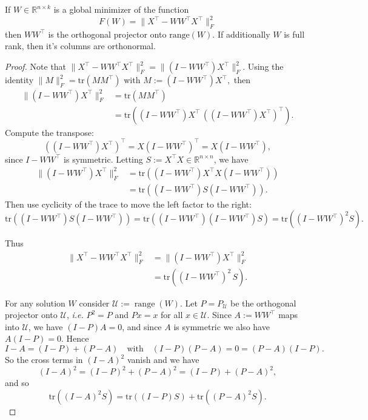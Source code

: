 \documentclass[twoside,11pt]{article}
\begin{document}
\begin{lemma}
\label{lem:orth_projector}
    If $W \in \mathbb{R}^{n\times k}$ is a global minimizer of the function
\[
    F(W)=\|X^\top-WW^\top X^\top\|_F^2
\] then $WW^\top$ is the orthogonal projector onto $\mathrm{range}(W)$. If additionally $W$ is full rank, then it's columns are orthonormal.
\label{lem:projection}
\end{lemma}
\begin{proof}
Note that $\|X^\top-WW^\top X^\top\|_F^2
=\|(I-WW^\top)X^\top\|_F^2$. Using the identity \(\|M\|_F^2=\mathrm{tr}(MM^\top)\) with $M:=(I-WW^\top)X^\top,$
then
\begin{align*}
\|(I-WW^\top)X^\top\|_F^2
&=\mathrm{tr}( M M^\top) \\
&=\mathrm{tr}((I-WW^\top)X^\top\,((I-WW^\top)X^\top)^\top).
\end{align*}
Compute the transpose:
\[
((I-WW^\top)X^\top)^{\top}
= X (I-WW^\top)^\top
= X (I-WW^\top),
\]
since \(I-WW^{\top}\) is symmetric. Letting $S:=X^\top X\in \mathbb{R}^{n\times n}$, we have
\begin{align*}
\|(I-WW^{\top})X^\top\|_F^2
&=\mathrm{tr}((I-WW^\top)X^\top X(I-WW^\top)) \\
&=\mathrm{tr}((I-WW^\top)S(I-WW^\top)).
\end{align*}
Then use cyclicity of the trace to move the left factor to the right:
\[
\mathrm{tr}((I-WW^{\top})S(I-WW^{\top}))
=
\mathrm{tr}((I-WW^\top)(I-WW^\top)S)
=
\mathrm{tr}((I-WW^\top)^2S).
\]

Thus
\begin{align*}
\|X^{\top}-WW^{\top}X^{\top}\|_F^2
&=\|(I-WW^{\top})X^{\top}\|_F^2 \\
&=\mathrm{tr}((I-WW^{\top})^2\,S).
\end{align*}


For any solution $W$ consider $\mathcal U:=\operatorname{range}(W)$. Let $P = P_\mathcal{U}$ be the orthogonal projector onto $\mathcal U$, \emph{i.e.} $P^2 = P$ and $Px = x$ for all $x\in \mathcal{U}$. Since $A:=WW^\top$ maps into $\mathcal U$, we have $(I-P)A=0$, and since $A$ is symmetric we also have $A(I-P)=0$. Hence
\[
I-A=(I-P)+(P-A)
\quad\text{with}\quad
(I-P)(P-A)=0=(P-A)(I-P).
\]
So the cross terms in $(I-A)^2$ vanish and we have 
\[
(I-A)^2=(I-P)^2+(P-A)^2=(I-P)+(P-A)^2,
\]
and so \[\mathrm{tr}((I-A)^2S)=
\mathrm{tr}((I-P)S)
+
\mathrm{tr}((P-A)^2S).\]


\end{proof}
\end{document}
